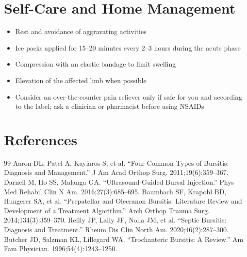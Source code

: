 \section*{Self-Care and Home Management}
\begin{itemize}
 \item Rest and avoidance of aggravating activities
 \item Ice packs applied for 15--20 minutes every 2--3 hours during the acute phase
 \item Compression with an elastic bandage to limit swelling
 \item Elevation of the affected limb when possible
 \item Consider an over-the-counter pain reliever only if safe for you and according to the label; ask a clinician or pharmacist before using NSAIDs
\end{itemize}

\section*{References}
\begin{thebibliography}{99}
 Aaron DL, Patel A, Kayiaros S, et al. ``Four Common Types of Bursitis: Diagnosis and Management.'' J Am Acad Orthop Surg. 2011;19(6):359--367.
 Darnell M, Ho SS, Malanga GA. ``Ultrasound-Guided Bursal Injection.'' Phys Med Rehabil Clin N Am. 2016;27(3):685--695.
 Baumbach SF, Krapohl BD, Hungerer SA, et al. ``Prepatellar and Olecranon Bursitis: Literature Review and Development of a Treatment Algorithm.'' Arch Orthop Trauma Surg. 2014;134(3):359--370.
 Reilly JP, Lally JF, Nolla JM, et al. ``Septic Bursitis: Diagnosis and Treatment.'' Rheum Dis Clin North Am. 2020;46(2):287--300.
 Butcher JD, Salzman KL, Lillegard WA. ``Trochanteric Bursitis: A Review.'' Am Fam Physician. 1996;54(4):1243--1250.
\end{thebibliography}
